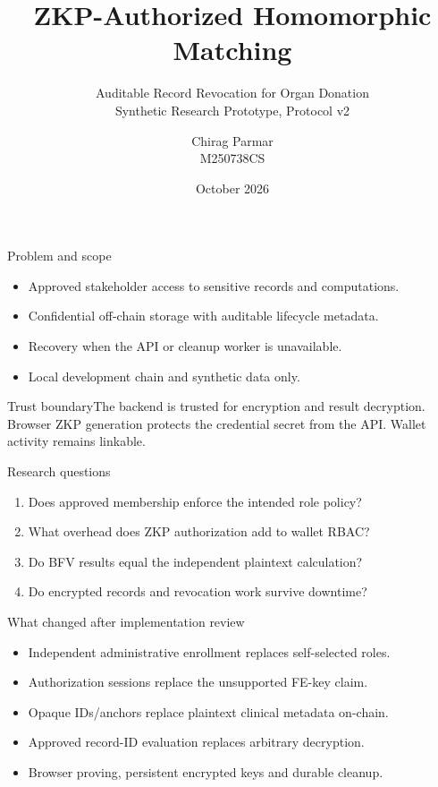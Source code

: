 \documentclass[10pt]{beamer}
\title{ZKP-Authorized Homomorphic Matching}
\subtitle{Auditable Record Revocation for Organ Donation\\Synthetic Research Prototype, Protocol v2}
\author{Chirag Parmar\\M250738CS}
\institute{NIT Calicut\\Guided by Dr. Abidha V.P. and Dr. Bijoy Das}
\date{October 2026}
\begin{document}
\begin{frame}\titlepage\end{frame}
\begin{frame}{Problem and scope}
\begin{itemize}
\item Approved stakeholder access to sensitive records and computations.
\item Confidential off-chain storage with auditable lifecycle metadata.
\item Recovery when the API or cleanup worker is unavailable.
\item Local development chain and synthetic data only.
\end{itemize}
\begin{block}{Trust boundary}The backend is trusted for encryption and result decryption. Browser ZKP generation protects the credential secret from the API. Wallet activity remains linkable.\end{block}
\end{frame}
\begin{frame}{Research questions}
\begin{enumerate}
\item Does approved membership enforce the intended role policy?
\item What overhead does ZKP authorization add to wallet RBAC?
\item Do BFV results equal the independent plaintext calculation?
\item Do encrypted records and revocation work survive downtime?
\end{enumerate}
\end{frame}
\begin{frame}{What changed after implementation review}
\begin{itemize}
\item Independent administrative enrollment replaces self-selected roles.
\item Authorization sessions replace the unsupported FE-key claim.
\item Opaque IDs/anchors replace plaintext clinical metadata on-chain.
\item Approved record-ID evaluation replaces arbitrary decryption.
\item Browser proving, persistent encrypted keys and durable cleanup.
\end{itemize}
\end{frame}
\end{document}
